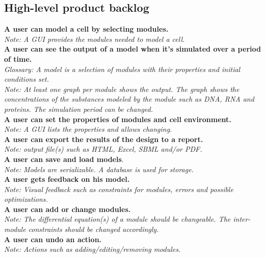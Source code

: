 \documentclass[10pt,a4paper]{report}
\begin{document}
		\subsection{High-level product backlog}
			\textbf{A user can model a cell by selecting modules.}\\
			\indent
				\textit{Note: A GUI provides the modules needed to model a cell.}\\
			\textbf{A user can see the output of a model when it’s simulated over a period of time.}\\
			\indent
				\textit{Glossary: A model is a selection of modules with their properties and initial conditions set.}\\
			\indent
				\textit{Note: At least one graph per module shows the output. The graph shows the concentrations of the substances modeled by the module such as DNA, RNA and proteins. The simulation period can be changed.}\\
			\textbf{A user can set the properties of modules and cell environment.}\\
			\indent
				\textit{Note: A GUI lists the properties and allows changing.}\\
			\textbf{A user can export the results of the design to a report.}\\
			\indent
				\textit{Note: output file(s) such as HTML, Excel, SBML and/or PDF.}\\
			\textbf{A user can save and load models}.\\
			\indent
				\textit{Note: Models are serializable. A database is used for storage.}\\
			\textbf{A user gets feedback on his model.}\\
			\indent
				\textit{Note: Visual feedback such as constraints for modules, errors and possible optimizations.}\\
			\textbf{A user can add or change modules.}\\
			\indent
				\textit{Note: The differential equation(s) of a module should be changeable. The inter-module constraints should be changed accordingly.}\\
			\textbf{A user can undo an action.}\\
			\indent
				\textit{Note: Actions such as adding/editing/removing modules.}\\
			
		\clearpage
\end{document}
